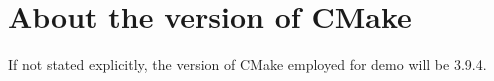 \section*{About the version of CMake}
If not stated explicitly, the version of CMake employed for demo will be 3.9.4.
